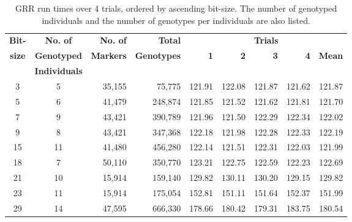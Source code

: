 \begin{table}[h]
\begin{center}
\begin{tabular}{ccrrrrrrr} \toprule
\textbf{Bit-} & \textbf{No. of}     &  \textbf{No. of}  & \textbf{Total}      & \multicolumn{5}{c}{\textbf{Trials}}              \\
\textbf{size} & \textbf{Genotyped} & \textbf{Markers} & \textbf{Genotypes} & \textbf{1}&\textbf{2}&\textbf{3}&\textbf{4}& \textbf{Mean}\\
              & \textbf{Individuals}                  &               &                  &         &       &        &        &        \\
\midrule
3        & 5                            & 35,155         & 75,775          & 121.91 & 122.08 & 121.87 & 121.62 & 121.87 \\
5        & 6                            & 41,479         & 248,874         & 121.85 & 121.52 & 121.62 & 121.81 & 121.70 \\
7        & 9                            & 43,421         & 390,789         & 121.96 & 121.50 & 122.29 & 122.34 & 122.02 \\
9        & 8                            & 43,421         & 347,368         & 122.18 & 121.98 & 122.28 & 122.33 & 122.19 \\
15       & 11                           & 41,480         & 456,280         & 122.14 & 121.51 & 122.31 & 122.03 & 121.99 \\
18       & 7                            & 50,110         & 350,770         & 123.21 & 122.75 & 122.59 & 122.23 & 122.69 \\
21       & 10                           & 15,914         & 159,140         & 129.82 & 130.11 & 130.20 & 129.15 & 129.82 \\
23       & 11                           & 15,914         & 175,054         & 152.81 & 151.11 & 151.64 & 152.37 & 151.99 \\
29       & 14                           & 47,595         & 666,330         & 178.66 & 180.42 & 179.31 & 183.75 & 180.54 \\
\hline
\end{tabular}
\end{center}
\vspace{-15pt}
\caption[GRR run times, 4 trials, ascending bit-size]{GRR run times over 4 trials, ordered by ascending bit-size. The number of genotyped individuals and the number of genotypes per individuals are also listed.}\label{table:res:grrtimes}
\end{table}

